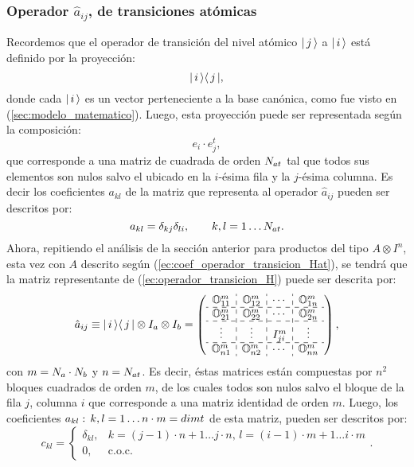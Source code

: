\subsubsection{Operador $\hat{a}_{ij}$, de transiciones at\'omicas}
\quad Recordemos que el operador de transici\'on del nivel at\'omico $\vert\, j \,\rangle$ a $\vert\, i \,\rangle$ est\'a definido por la proyecci\'on:
$$\vert\, i \,\rangle\langle\, j \,\vert,$$
donde cada $\vert\, i \,\rangle$ es un vector perteneciente a la base can\'onica, como fue visto en (\ref{sec:modelo_matematico}). Luego, esta proyecci\'on puede ser representada seg\'un la composici\'on:
$$e_i\cdot e_j^t,$$
que corresponde a una matriz de cuadrada de orden $N_{at}$ tal que todos sus elementos son nulos salvo el ubicado en la $i$-\'esima fila y la $j$-\'esima columna. Es decir los coeficientes $a_{kl}$ de la matriz que representa al operador $\hat{a}_{ij}$ pueden ser descritos por:\begin{equation}
 a_{kl}=\delta_{kj}\delta_{li},\qquad k,l=1\ldots N_{at}.\label{ec:coef_operador_transicion_Hat}
\end{equation}
\quad Ahora, repitiendo el an\'alisis de la secci\'on anterior para productos del tipo $A\otimes I^n$, esta vez con $A$ descrito seg\'un (\ref{ec:coef_operador_transicion_Hat}), se tendr\'a que la matriz representante de (\ref{ec:operador_transicion_H}) puede ser descrita por:\begin{equation}\hat{a}_{ij}\equiv \ket{i}\bra{j}\otimes I_a \otimes I_b=\label{ec:matriz_operador_transicion_H}
\left(\begin{array}{c:c:c:c}
\mathbb{O}^m_{11} & \mathbb{O}^m_{12} & \cdots & \mathbb{O}^m_{1n} \\ \hdashline
\mathbb{O}^m_{21} & \mathbb{O}^m_{22} & \cdots & \mathbb{O}^m_{2n} \\ \hdashline
\vdots & \vdots & I^m_{ji} & \vdots \\ \hdashline 
\mathbb{O}^m_{n1} & \mathbb{O}^m_{n2} & \cdots & \mathbb{O}^m_{nn}
\end{array}\right),
\end{equation}
con $m=N_a\cdot N_b$ y $n=N_{at}$. Es decir, \'estas matrices est\'an compuestas por $n^2$ bloques cuadrados de orden $m$, de los cuales todos son nulos salvo el bloque de la fila $j$, columna $i$ que corresponde a una matriz identidad de orden $m$. Luego, los coeficientes $a_{kl}:\,k,l=1\ldots n\cdot m=dimt$ de esta matriz, pueden ser descritos por:\begin{equation}\label{ec:coef_operador_transicion_H}
 c_{kl}=\left\{\begin{array}{ll}
\delta_{kl}, & k=(j-1)\cdot n+1\ldots j\cdot n,\,l=(i-1)\cdot m+1\ldots i\cdot m \\
0, & \mbox{c.o.c.}
\end{array}\right..
\end{equation}

